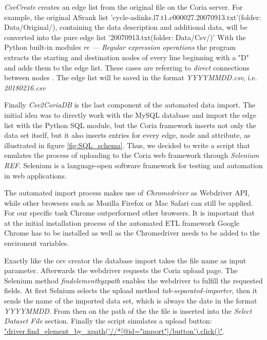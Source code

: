 \documentclass[conference, 11pt]{IEEEtran}
\begin{document}
\textit{CsvCreate} creates an edge list from the original file on the Coria server.
For example, the original ASrank list 'cycle-aslinks.l7.t1.c000027.20070913.txt'(folder: Data/Original/), containing the data description and additional data, will be converted into the pure edge list '20070913.txt(folder: Data/Csv/)' With the Python built-in modules \textit{re — Regular expression operations} the program extracts the starting and destination nodes of every line beginning with a "D" and adds them to the edge list. These cases are referring to \textit{direct} connections between nodes \cite{IPv4Data}. The edge list will be saved in the format \textit{YYYYMMDD.csv}, i.e. \textit{20180216.csv}
\linebreak

Finally \textit{Csv2CoriaDB} is the last component of the automated data import. The initial idea was to directly work with the MySQL database and import the edge list with the Python SQL module, but the Coria framework inserts not only the data set itself, but it also inserts entries for every edge, node and attribute, as illustrated in figure \ref{fig:SQL_schema}. Thus, we decided to write a script that emulates the process of uploading to the Coria web framework through \textit{Selenium REF}. Selenium is a language-open software framework for testing and automation in web applications.\linebreak

The automated import process makes use of \textit{Chromedriver} as Webdriver API, while other browsers such as Mozilla Firefox or Mac Safari can still be applied. For our specific task Chrome outperformed other browsers. It is important that at the initial installation process of the automated ETL framework Google Chrome has to be installed as well as the Chromedriver needs to be added to the environent variables.

Exactly like the csv creator the database import takes the file name as input parameter.
Afterwards the webdriver requests the Coria upload page. The Selenium method \textit{findelementbyxpath} enables the webdriver to fulfill the requested fields.
At first Selnium selects the upload method \textit{tab-separated-importer}, then it sends the name of the imported data set, which is always the date in the format \textit{YYYYMMDD}.
From then on the path of the the file is inserted into the \textit{Select Dataset File} section. Finally the script simulates a upload button:  \url{"driver.find_element_by_xpath('//*[@id="import"]/button').click()"}. \\
\end{document}
